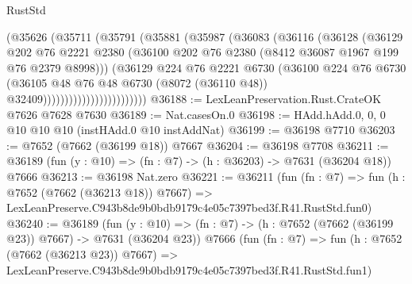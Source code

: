 \begin{lexlean}{RustStd}
\begin{coremodule}
                              (@35626
                                (@35711
                                  (@35791
                                    (@35881
                                      (@35987
                                        (@36083
                                          (@36116
                                            (@36128
                                              (@36129
                                                @202
                                                @76
                                                @2221
                                                @2380
                                                (@36100
                                                  @202
                                                  @76
                                                  @2380
                                                  (@8412 @36087 @1967 @199 @76 @2379 @8998)))
                                              (@36129
                                                @224
                                                @76
                                                @2221
                                                @6730
                                                (@36100
                                                  @224
                                                  @76
                                                  @6730
                                                  (@36105
                                                    @48
                                                    @76
                                                    @48
                                                    @6730
                                                    (@8072 (@36110 @48))
                                                    @32409))))))))))))))))))))))))
@36188 := LexLeanPreservation.Rust.CrateOK @7626 @7628 @7630
@36189 := Nat.casesOn.{0}
@36198 := HAdd.hAdd.{0, 0, 0} @10 @10 @10 (instHAdd.{0} @10 instAddNat)
@36199 := @36198 @7710
@36203 := @7652 (@7662 (@36199 @18)) @7667
@36204 := @36198 @7708
@36211 := @36189 (fun (y : @10) => (fn : @7) -> (h : @36203) -> @7631 (@36204 @18)) @7666
@36213 := @36198 Nat.zero
@36221 := @36211
    (fun (fn : @7) =>
    fun (h : @7652 (@7662 (@36213 @18)) @7667) =>
    LexLeanPreserve.C943b8de9b0bdb9179c4e05c7397bed3f.R41.RustStd.fun0)
@36240 := @36189
    (fun (y : @10) => (fn : @7) -> (h : @7652 (@7662 (@36199 @23)) @7667) -> @7631 (@36204 @23))
    @7666
    (fun (fn : @7) =>
    fun (h : @7652 (@7662 (@36213 @23)) @7667) =>
    LexLeanPreserve.C943b8de9b0bdb9179c4e05c7397bed3f.R41.RustStd.fun1)

\end{coremodule}
\end{lexlean}
